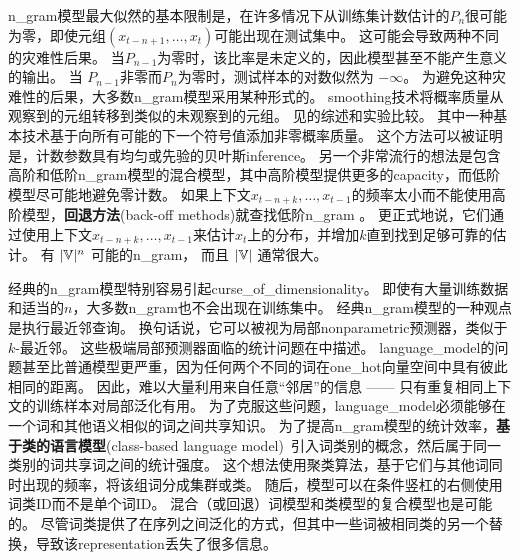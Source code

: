 \gls{n_gram}模型最大似然的基本限制是，在许多情况下从训练集计数估计的$P_n$很可能为零，即使元组$(x_{t-n+1},  \ldots, x_{t})$可能出现在测试集中。
这可能会导致两种不同的灾难性后果。
当$P_{n-1}$为零时，该比率是未定义的，因此模型甚至不能产生意义的输出。
当 $P_{n-1}$非零而$P_n$为零时，测试样本的对数似然为 $-\infty$。
为避免这种灾难性的后果，大多数\gls{n_gram}模型采用某种形式的。
\gls{smoothing}技术将概率质量从观察到的元组转移到类似的未观察到的元组。
见\citet{Chen+Goodman99}的综述和实验比较。
其中一种基本技术基于向所有可能的下一个符号值添加非零概率质量。
这个方法可以被证明是，计数参数具有均匀或先验的贝叶斯\gls{inference}。
另一个非常流行的想法是包含高阶和低阶\gls{n_gram}模型的混合模型，其中高阶模型提供更多的\gls{capacity}，而低阶模型尽可能地避免零计数。
如果上下文$x_{t-n+k}, \ldots, x_{t-1}$的频率太小而不能使用高阶模型，\textbf{回退方法}(back-off methods)就查找低阶\gls{n_gram} 。
更正式地说，它们通过使用上下文$x_{t-n+k}, \ldots, x_{t-1}$来估计$x_t$上的分布，并增加$k$直到找到足够可靠的估计。
有 $|\mathbb{V}|^n$ 可能的\gls{n_gram}， 而且 $|\mathbb{V}|$ 通常很大。

经典的\gls{n_gram}模型特别容易引起\gls{curse_of_dimensionality}。
即使有大量训练数据和适当的$n$，大多数\gls{n_gram}也不会出现在训练集中。
经典\gls{n_gram}模型的一种观点是执行最近邻查询。
换句话说，它可以被视为局部\gls{nonparametric}预测器，类似于$k$-最近邻。
这些极端局部预测器面临的统计问题在中描述。
\gls{language_model}的问题甚至比普通模型更严重，因为任何两个不同的词在\gls{one_hot}向量空间中具有彼此相同的距离。
因此，难以大量利用来自任意``邻居''的信息 —— 只有重复相同上下文的训练样本对局部泛化有用。
为了克服这些问题，\gls{language_model}必须能够在一个词和其他语义相似的词之间共享知识。
为了提高\gls{n_gram}模型的统计效率，\textbf{基于类的语言模型}(class-based language model)~\citep{Brown92,Ney+Kneser93,Niesler98}引入词类别的概念，然后属于同一类别的词共享词之间的统计强度。
这个想法使用聚类算法，基于它们与其他词同时出现的频率，将该组词分成集群或类。
随后，模型可以在条件竖杠的右侧使用词类ID而不是单个词ID。
混合（或回退）词模型和类模型的复合模型也是可能的。
尽管词类提供了在序列之间泛化的方式，但其中一些词被相同类的另一个替换，导致该\gls{representation}丢失了很多信息。

\subsection{}
\label{sec:neural_language_models}

